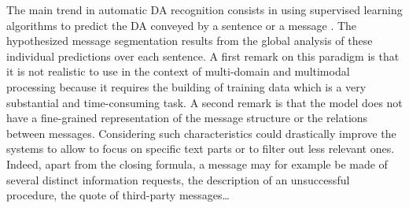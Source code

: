 %
The main trend in automatic DA recognition consists in using supervised learning algorithms to predict the DA conveyed by a sentence or a message \cite{joty:2013:sigdial}.
%
The hypothesized message segmentation results from the global analysis of these individual predictions over each sentence.
%
A first remark on this paradigm is that it is not realistic to use in the context of multi-domain and multimodal processing because it requires the building of training data which is a very substantial and time-consuming task.
%
A second remark is that the model does not have a fine-grained representation of the message structure or the relations between messages. Considering such characteristics could drastically improve the systems %
to allow to focus on specific text parts or to filter out less relevant ones. %
Indeed, apart from the closing formula, a message may for example be made of several distinct information requests, the description of an unsuccessful procedure, the quote of third-party messages\ldots

